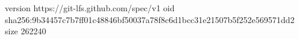 version https://git-lfs.github.com/spec/v1
oid sha256:9b34457c7b7ff01c48846bf50037a78f8c6d1bcc31e21507b5f252e569571dd2
size 262240
